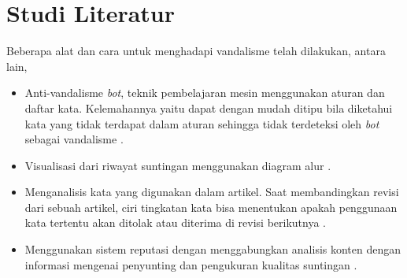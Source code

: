 \section{Studi Literatur}\label{sec:studi-literatur}

Beberapa alat dan cara untuk menghadapi vandalisme telah dilakukan, antara lain,

\begin{itemize}
	\item Anti-vandalisme \textit{bot}, teknik pembelajaran mesin menggunakan
	aturan dan daftar kata. Kelemahannya yaitu dapat dengan mudah ditipu
	bila diketahui kata yang tidak terdapat dalam aturan sehingga tidak
	terdeteksi oleh \textit{bot} sebagai vandalisme
	\cite{Smets08automaticvandalism}.
	\item Visualisasi dari riwayat suntingan menggunakan diagram alur
	\cite{viegas2004studying}.
	\item Menganalisis kata yang digunakan dalam artikel. Saat membandingkan
	revisi dari sebuah artikel, ciri tingkatan kata bisa menentukan apakah
	penggunaan kata tertentu akan ditolak atau diterima di revisi berikutnya
	\cite{rzeszotarski2012learning}.
	\item Menggunakan sistem reputasi dengan menggabungkan analisis konten
	dengan informasi mengenai penyunting dan pengukuran kualitas suntingan
	\cite{adler2010detecting}.
\end{itemize}